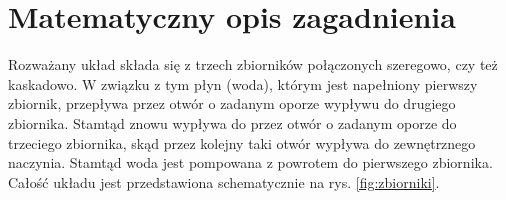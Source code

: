 \chapter{Matematyczny opis zagadnienia}
\label{cha:model}

\newtheorem{torricelli}{Prawo Torricellego}[chapter]
\newtheorem{pontriagin-max}{Zasada maksimum Pontriagina}[chapter]

Rozważany układ składa się z trzech zbiorników połączonych szeregowo, czy też kaskadowo.
W związku z tym płyn (woda), którym jest napełniony pierwszy zbiornik, przepływa przez otwór o zadanym oporze wypływu do drugiego zbiornika.
Stamtąd znowu wypływa do przez otwór o zadanym oporze do trzeciego zbiornika, skąd przez kolejny taki otwór wypływa do zewnętrznego naczynia.
Stamtąd woda jest pompowana z powrotem do pierwszego zbiornika.
Całość układu jest przedstawiona schematycznie na rys. \ref{fig:zbiorniki}.


